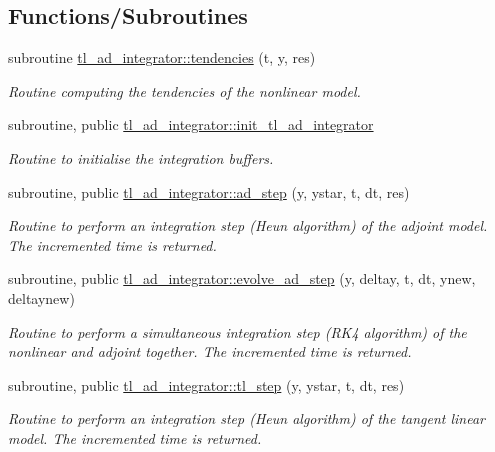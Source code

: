 \subsection*{Functions/\+Subroutines}
\begin{DoxyCompactItemize}
\item 
subroutine \hyperlink{namespacetl__ad__integrator_aa03be9677761cfa373b15c85cccdc424}{tl\+\_\+ad\+\_\+integrator\+::tendencies} (t, y, res)
\begin{DoxyCompactList}\small\item\em Routine computing the tendencies of the nonlinear model. \end{DoxyCompactList}\item 
subroutine, public \hyperlink{namespacetl__ad__integrator_aeef5ff45fe5f9b73ceb8d72c195dc381}{tl\+\_\+ad\+\_\+integrator\+::init\+\_\+tl\+\_\+ad\+\_\+integrator}
\begin{DoxyCompactList}\small\item\em Routine to initialise the integration buffers. \end{DoxyCompactList}\item 
subroutine, public \hyperlink{namespacetl__ad__integrator_a708ece5eac01486e65e889d19073fd19}{tl\+\_\+ad\+\_\+integrator\+::ad\+\_\+step} (y, ystar, t, dt, res)
\begin{DoxyCompactList}\small\item\em Routine to perform an integration step (Heun algorithm) of the adjoint model. The incremented time is returned. \end{DoxyCompactList}\item 
subroutine, public \hyperlink{namespacetl__ad__integrator_abc53f72486953af9fa4ced620eee226f}{tl\+\_\+ad\+\_\+integrator\+::evolve\+\_\+ad\+\_\+step} (y, deltay, t, dt, ynew, deltaynew)
\begin{DoxyCompactList}\small\item\em Routine to perform a simultaneous integration step (R\+K4 algorithm) of the nonlinear and adjoint together. The incremented time is returned. \end{DoxyCompactList}\item 
subroutine, public \hyperlink{namespacetl__ad__integrator_ac88b155557d4fc0bae70007fde3aef06}{tl\+\_\+ad\+\_\+integrator\+::tl\+\_\+step} (y, ystar, t, dt, res)
\begin{DoxyCompactList}\small\item\em Routine to perform an integration step (Heun algorithm) of the tangent linear model. The incremented time is returned. \end{DoxyCompactList}\item 

\end{DoxyCompactItemize}
